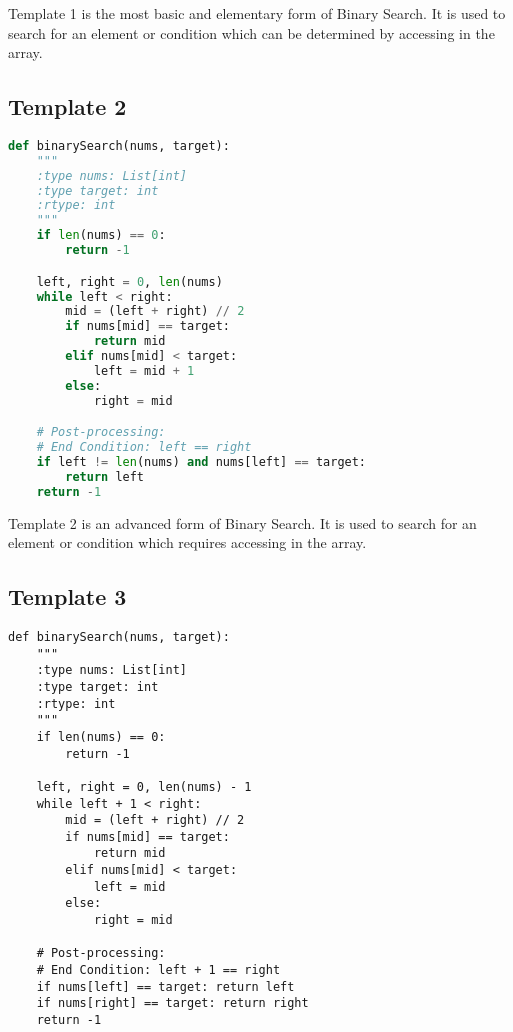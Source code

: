 Template 1 is the most basic and elementary form of Binary Search.
It is used to search for an element or condition which can be determined by accessing  in the array.



\subsection{Template 2}
\label{sec:template-2}

\begin{lstlisting}[language=python]
def binarySearch(nums, target):
    """
    :type nums: List[int]
    :type target: int
    :rtype: int
    """
    if len(nums) == 0:
        return -1

    left, right = 0, len(nums)
    while left < right:
        mid = (left + right) // 2
        if nums[mid] == target:
            return mid
        elif nums[mid] < target:
            left = mid + 1
        else:
            right = mid

    # Post-processing:
    # End Condition: left == right
    if left != len(nums) and nums[left] == target:
        return left
    return -1

\end{lstlisting}

Template 2 is an advanced form of Binary Search.
It is used to search for an element or condition which requires accessing  in the array.

\subsection{Template 3}
\label{sec:template-3}

\begin{lstlisting}
def binarySearch(nums, target):
    """
    :type nums: List[int]
    :type target: int
    :rtype: int
    """
    if len(nums) == 0:
        return -1

    left, right = 0, len(nums) - 1
    while left + 1 < right:
        mid = (left + right) // 2
        if nums[mid] == target:
            return mid
        elif nums[mid] < target:
            left = mid
        else:
            right = mid

    # Post-processing:
    # End Condition: left + 1 == right
    if nums[left] == target: return left
    if nums[right] == target: return right
    return -1
\end{lstlisting}

